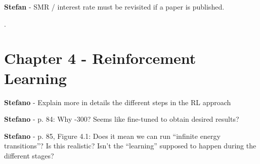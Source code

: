 \documentclass[12pt,a4paper]{article}
\begin{document}
\begin{mdframed}[style=comment] %
{\color{teal} \textbf{Stefan}} - SMR / interest rate must be revisited if a paper is published.
\end{mdframed}

\noindent {\color{blue} }. 

\begin{mdframed}[style=manuscript] %

\end{mdframed}

\section{Chapter 4 - Reinforcement Learning}
\label{Chap_RL}

\begin{mdframed}[style=comment] %
{\color{orange} \textbf{Stefano}} - Explain more in details the different steps in the RL approach
\end{mdframed}

\noindent 

\begin{mdframed}[style=manuscript] %

\end{mdframed}

\begin{mdframed}[style=comment] %
{\color{orange} \textbf{Stefano}} - p. 84: Why -300? Seems like fine-tuned to obtain desired results?
\end{mdframed}

\noindent 

\begin{mdframed}[style=manuscript] %

\end{mdframed}

\begin{mdframed}[style=comment] %
{\color{orange} \textbf{Stefano}} - p. 85, Figure 4.1: Does it mean we can run ``infinite energy transitions''? Is this realistic? Isn’t the ``learning'' supposed to happen during the different stages?
\end{mdframed}

\noindent 

\begin{mdframed}[style=manuscript] %

\end{mdframed}
\end{document}
